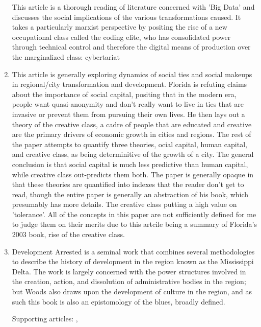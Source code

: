 \documentclass{article}
\begin{document}
\begin{enumerate}
This article is a thorough reading of literature concerned with 'Big
Data' and discusses the social implications of the various
transformations caused. It takes a particularly marxist perspective by
positing the rise of a new occupational class called the coding elite,
who has consolidated power through technical control and therefore the
digital means of production over the marginalized class: cybertariat
  
\item \cite{florida2003CitiesCreative}

This article is generally exploring dynamics of social ties and social
makeups in regional/city transformation and development. Florida is
refuting claims about the importance of social capital, positing that
in the modern era, people want quasi-anonymity and don't really want
to live in ties that are invasive or prevent them from pursuing their
own lives. He then lays out a theory of the creative class, a cadre of
people that are educated and creative are the primary drivers of
economic growth in cities and regions. The rest of the paper attempts
to quantify three theories, ocial capital, human capital, and creative
class, as being determinitive of the growth of a city. The general
conclusion is that social capital is much less predictive than human
capital, while creative class out-predicts them both. The paper is
generally opaque in that these theories are quantified into indexes
that the reader don't get to read, though the entire paper is
generally an abstraction of his book, which presumably has more
details. The creative class putting a high value on 'tolerance'. All
of the concepts in this paper are not sufficiently defined for me to
judge them on their merits due to this artcile being a summary of
Florida's 2003 book, rise of the creative class.
  
\item \cite{woods2017DevelopmentArrested}

Development Arrested is a seminal work that combines several
methodologies to describe the history of development in the region
known as the Mississippi Delta. The work is largely concerned with the
power structures involved in the creation, action, and dissolution of
administrative bodies in the region; but Woods also draws upon the
development of culture in the region, and as such this book is also an
epistomology of the blues, broadly defined.

Supporting articles: \cite{isenberg2004SymposiumWoods},
\cite{tiefenbacher2019DevelopmentArrested}


\end{enumerate}
\end{document}
